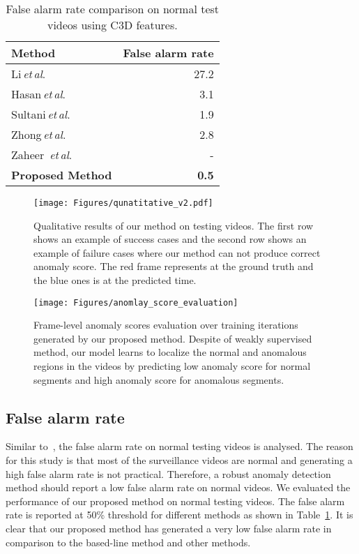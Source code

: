 \documentclass[journal]{IEEEtran}
\newcommand{\authorcite}{{\textit{et}\,\textit{al}.}}
\begin{document}
\begin{table}
	\centering
	\caption{False alarm rate comparison on normal test videos using C3D features.}	
	\label{Tab:False_alram}
	\vspace{2mm}
\begin{tabular}{lr}
	    \toprule
	    Method  & False alarm rate \\
	    \midrule
	    Li\,\authorcite~\cite{li2013anomaly} & 27.2\\ 
	    Hasan\,\authorcite~\cite{hasan2016learning} & 3.1 \\
	    Sultani\,\authorcite~\cite{sultani2018real} & 1.9 \\
	    Zhong\,\authorcite~\cite{Zhong_2019_CVPR} & 2.8 \\
	    Zaheer~\authorcite~\cite{zaheer2020claws}&-\\
	    \midrule
	    \textbf{Proposed Method} & \textbf{0.5} \\
	    \bottomrule
	\end{tabular}
\end{table}\begin{figure*}
	\centering
	\texttt{[image: Figures/qunatitative\_v2.pdf]}
	\caption{Qualitative results of our method on testing videos. The first row shows an example of success cases and the second row shows an example of failure cases where our method can not produce correct anomaly score. The red frame represents at the ground truth and the blue ones is at the predicted time.}
	\label{fig:qulatitive_results}
\end{figure*}
\begin{figure*}

	\centering
	\texttt{[image: Figures/anomlay\_score\_evaluation]}
	\caption{Frame-level anomaly scores evaluation over training iterations generated by our proposed method. Despite of weakly supervised method, our model learns to localize the normal and anomalous regions in the videos by predicting low anomaly score for normal segments and high anomaly score for anomalous segments.}
	\label{Fig:Anomly_score_evalution}
\end{figure*}

\subsection{False alarm rate}
Similar to~\cite{sultani2018real}, the false alarm rate on normal testing videos is analysed. The reason for this study is that most of the surveillance videos are normal and generating a high false alarm rate is not practical. Therefore, a robust anomaly detection method should report a low false alarm rate on normal videos. We evaluated the performance of our proposed method on normal testing videos. The false alarm rate is reported at 50\% threshold for different methods as shown in Table~\ref{Tab:False_alram}. It is clear that our proposed method has generated a very low false alarm rate in comparison to the based-line method and other methods.
\end{document}
